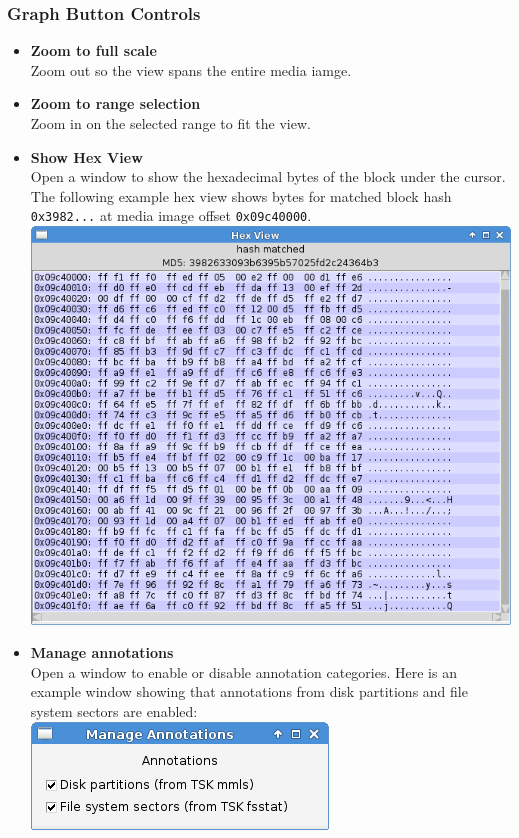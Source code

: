 \documentclass[11pt,fleqn]{article} %
\begin{document}
\subsubsection{Graph Button Controls}
\begin{itemize}
\item \textbf{Zoom to full scale}\\
Zoom out so the view spans the entire media iamge.
\item \textbf{Zoom to range selection}\\
Zoom in on the selected range to fit the view.
\item \textbf{Show Hex View}\\
Open a window to show the hexadecimal bytes of the block under the cursor.
The following example hex view shows bytes for matched block hash \verb+0x3982...+ at media image offset \verb+0x09c40000+.\\
\includegraphics[scale=.4]{screenshots/hex_view}\\
\item \textbf{Manage annotations}\\
Open a window to enable or disable annotation categories. Here is an example window showing that annotations from disk partitions and file system sectors are enabled:\\
\includegraphics[scale=.4]{screenshots/manage_annotations}\\

\end{itemize}
\end{document}
